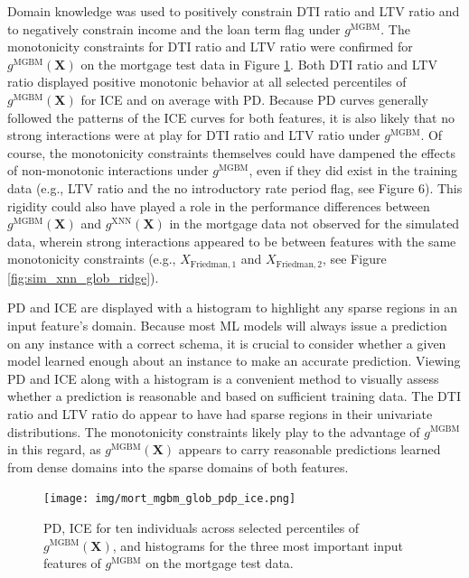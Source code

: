 \documentclass[information,article,accept,moreauthors,pdftex]{Definitions/mdpi}
\begin{document}
Domain knowledge was used to positively constrain DTI ratio and LTV ratio and to negatively constrain income and the loan term flag under $g^\text{MGBM}$. The monotonicity constraints for DTI ratio and LTV ratio were confirmed for $g^\text{MGBM}(\mathbf{X})$ on the mortgage test data in Figure \ref{fig:mort_mgbm_glob_pdp_ice}. Both DTI ratio and LTV ratio displayed positive monotonic behavior at all selected percentiles of $g^\text{MGBM}(\mathbf{X})$ for ICE and on average with PD. Because PD curves generally followed the patterns of the ICE curves for both features, it is also likely that no strong interactions were at play for DTI ratio and LTV ratio under $g^\text{MGBM}$. Of course, the monotonicity constraints themselves could have dampened the effects of non-monotonic interactions under $g^\text{MGBM}$, even if they did exist in the training data (e.g., LTV ratio and the no introductory rate period flag, see {Figure} 6). This rigidity could also have played a role in the performance differences between $g^\text{MGBM}(\mathbf{X})$ and $g^\text{XNN}(\mathbf{X})$ in the mortgage data not observed for the simulated data, wherein strong interactions appeared to be between features with the same monotonicity constraints (e.g., $X_{\text{Friedman},1}$ and $X_{\text{Friedman},2}$, see Figure \ref{fig:sim_xnn_glob_ridge}).%

PD and ICE are displayed with a histogram to highlight any sparse regions in an input feature's domain. Because most ML models will always issue a prediction on any instance with a correct schema, it is crucial to consider whether a given model learned enough about an instance to make an accurate prediction. Viewing PD and ICE along with a histogram is a convenient method to visually assess whether a prediction is reasonable and based on sufficient training data. The DTI ratio and LTV ratio do appear to have had sparse regions in their univariate distributions. The monotonicity constraints likely play to the advantage of $g^\text{MGBM}$ in this regard, as $g^\text{MGBM}(\mathbf{X})$ appears to carry reasonable predictions learned from dense domains into the sparse domains of both features. 

\begin{figure}[H]
\centering
 \texttt{[image: img/mort\_mgbm\_glob\_pdp\_ice.png]}
\caption{PD, ICE for ten individuals across selected percentiles of $g^\text{MGBM}(\mathbf{X})$, and histograms for the three most important input features of $g^\text{MGBM}$ on the mortgage test data.}
\label{fig:mort_mgbm_glob_pdp_ice}
\end{figure}   
\end{document}
